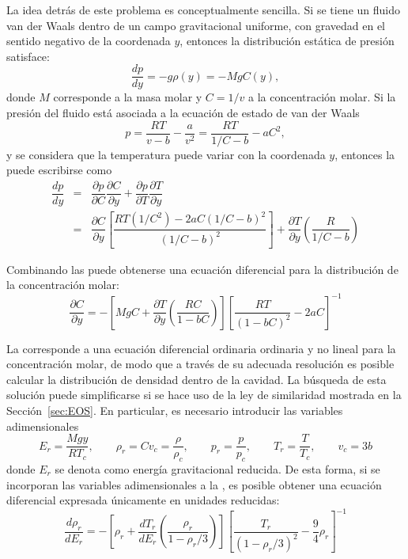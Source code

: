 La idea detr\'as de este problema es conceptualmente sencilla. Si se tiene un fluido van der Waals dentro de un campo gravitacional uniforme, con gravedad en el sentido negativo de la coordenada $y$, entonces la distribuci\'on est\'atica de presi\'on satisface:
\begin{equation}
	\dfrac{dp}{dy} = -g\rho(y) = -MgC(y),
	\label{eq:p_hidrost}
\end{equation}
donde $M$ corresponde a la masa molar y $C=1/v$ a la concentraci\'on molar. Si la presi\'on del fluido est\'a asociada a la ecuaci\'on de estado de van der Waals
\begin{equation}
	p = \dfrac{RT}{v-b} - \dfrac{a}{v^2} = \dfrac{RT}{1/C-b} - aC^2,
\end{equation}
y se considera que la temperatura puede variar con la coordenada $y$, entonces la  puede escribirse como
\begin{equation}
	\begin{array}{rcl}
		\dfrac{dp}{dy} &=& \dfrac{\partial p }{\partial C} \dfrac{\partial C}{\partial y}	 + \dfrac{\partial p}{\partial T}\dfrac{\partial T}{\partial y} \\[3mm]
		&=& \dfrac{\partial C}{\partial y}\left[ \dfrac{RT(1/C^2)- 2aC(1/C-b)^2}{(1/C-b)^2} \right] + \dfrac{\partial T}{\partial y}\left( \dfrac{R}{1/C-b}\right)
	\end{array}
	\label{eq:partial_p}
\end{equation}

Combinando las  puede obtenerse una ecuaci\'on diferencial para la distribuci\'on de la concentraci\'on molar:
\begin{equation}
	\dfrac{\partial C}{\partial y} = -\left[ MgC + \dfrac{\partial T}{\partial y}\left( \dfrac{RC}{1-bC} \right) \right] \left[ \dfrac{RT}{(1-bC)^2} -2aC \right]^{-1}
	\label{eq:vdw_molar}
\end{equation} 

La  corresponde a una ecuaci\'on diferencial ordinaria ordinaria y no lineal para la concentraci\'on molar, de modo que a trav\'es de su adecuada resoluci\'on es posible calcular la distribuci\'on de densidad dentro de la cavidad. 
La b\'usqueda de esta soluci\'on puede simplificarse si se hace uso de la ley de similaridad mostrada en la Secci\'on~\ref{sec:EOS}. En particular, es necesario introducir las variables adimensionales
\begin{equation}
	E_r = \dfrac{Mgy}{RT_c}, \qquad \rho_r=Cv_c=\dfrac{\rho}{\rho_c}, \qquad p_r=\dfrac{p}{p_c}, \qquad T_r = \dfrac{T}{T_c}, \qquad v_c = 3b
\end{equation}
donde $E_r$ se denota como energ\'ia gravitacional reducida. De esta forma, si se incorporan las variables adimensionales a la , es posible obtener una ecuaci\'on diferencial expresada \'unicamente en unidades reducidas:
\begin{equation}
	\dfrac{d\rho_r}{dE_r} = -\left[ \rho_r + \dfrac{dT_r}{dE_r} \left( \dfrac{\rho_r}{1-\rho_r/3} \right) \right]
\left[ \dfrac{T_r}{(1-\rho_r/3)^2} -\dfrac{9}{4}\rho_r \right]^{-1}
	\label{eq:vdw_column_red}
\end{equation}

